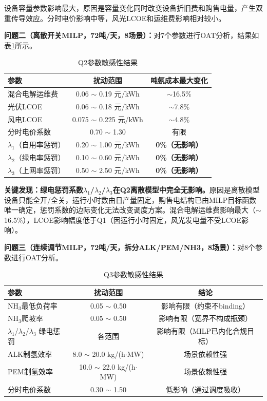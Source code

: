 \documentclass[zihao=-4,a4paper]{ctexart} %
\begin{document}
	设备容量参数影响最大，原因是容量变化同时改变设备折旧费和购售电量，产生双重传导效应。分时电价影响中等，风光LCOE和运维费影响相对较小。
	
	\textbf{问题二（离散开关MILP，72吨/天，8场景）：}对7个参数进行OAT分析，结果如表\ref{tab:q6_q2}所示。
	
	\begin{table}[ht]
		\centering
		\small
		\caption{Q2参数敏感性结果}
		\label{tab:q6_q2}
		\begin{tabular}{lcc}
			\toprule
			参数 & 扰动范围 & 吨氨成本最大变化 \\
			\midrule
			混合电解运维费 & 0.06 $\sim$ 0.19 元/kWh & $\sim$16.5\% \\
			光伏LCOE & 0.06 $\sim$ 0.18 元/kWh & $\sim$7.8\% \\
			风电LCOE & 0.075 $\sim$ 0.225 元/kWh & $\sim$4.8\% \\
			分时电价系数 & 0.70 $\sim$ 1.30 & 有限 \\
			$\lambda_1$（自用率惩罚） & 0.20 $\sim$ 1.00 元/kWh & \textbf{0\%（无影响）} \\
			$\lambda_2$（绿电率惩罚） & 0.10 $\sim$ 0.60 元/kWh & \textbf{0\%（无影响）} \\
			$\lambda_3$（上网率惩罚） & 0.50 $\sim$ 2.50 元/kWh & \textbf{0\%（无影响）} \\
			\bottomrule
		\end{tabular}
	\end{table}
	
	\textbf{关键发现：绿电惩罚系数$\lambda_1$/$\lambda_2$/$\lambda_3$在Q2离散模型中完全无影响。}原因是离散模型设备只能全开/全关，运行小时数由日产量固定，购售电结构已由MILP目标函数唯一确定，惩罚系数的边际变化无法改变调度方案。混合电解运维费影响最大（$\sim$16.5\%），LCOE影响幅度低于Q1（因运行小时固定，风光发电量不受LCOE影响）。
	
	\textbf{问题三（连续调节MILP，72吨/天，拆分ALK/PEM/NH3，8场景）：}对8个参数进行OAT分析。
	
	\begin{table}[ht]
		\centering
		\small
		\caption{Q3参数敏感性结果}
		\label{tab:q6_q3}
		\begin{tabular}{lcc}
			\toprule
			参数 & 扰动范围 & 结论 \\
			\midrule
			NH$_3$最低负荷率 & 0.05 $\sim$ 0.50 & 影响有限（约束不binding） \\
			NH$_3$爬坡率 & 0.05 $\sim$ 0.50 & 影响有限（宽界不构成瓶颈） \\
			$\lambda_1$/$\lambda_2$/$\lambda_3$ 绿电惩罚 & 各范围 & 影响有限（MILP已内化合规目标） \\
			ALK制氢效率 & 8.0 $\sim$ 20.0 kg/(h$\cdot$MW) & 场景依赖性强 \\
			PEM制氢效率 & 10.0 $\sim$ 22.0 kg/(h$\cdot$MW) & 场景依赖性强 \\
			分时电价系数 & 0.30 $\sim$ 1.50 & 低影响（通过调度吸收） \\
			\bottomrule
		\end{tabular}
	\end{table}
	
\end{document}
